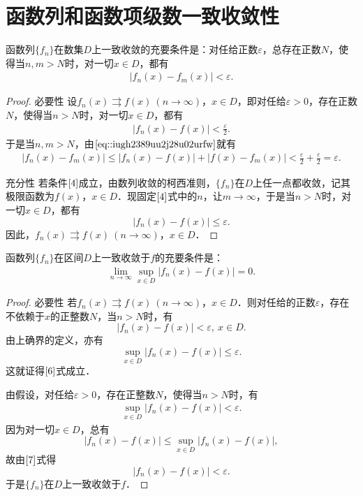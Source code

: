 \documentclass[../../main.tex]{subfiles}%
\begin{document}
\section{函数列和函数项级数一致收敛性}

\begin{theorem}[函数列一致收敛的柯西准则]\label{theorem:函数列一致收敛的柯西准则}
函数列\(\{f_n\}\)在数集\(D\)上一致收敛的充要条件是：对任给正数\(\varepsilon\)，总存在正数\(N\)，使得当\(n, m > N\)时，对一切\(x \in D\)，都有
\begin{align}
|f_n(x) - f_m(x)| < \varepsilon.\label{4}
\end{align}
\end{theorem}
\begin{proof}

{\heiti 必要性} 设\(f_n(x) \rightrightarrows f(x) \ (n \to \infty)\)，\(x \in D\)，即对任给\(\varepsilon > 0\)，存在正数\(N\)，使得当\(n > N\)时，对一切\(x \in D\)，都有
\begin{align}
|f_n(x) - f(x)| < \frac{\varepsilon}{2}. \label{eq::iugh2389uu2j28u02urfw}
\end{align}
于是当\(n, m > N\)，由\(\eqref{eq::iugh2389uu2j28u02urfw}\)就有
\begin{align*}
|f_n(x) - f_m(x)| \leqslant |f_n(x) - f(x)| + |f(x) - f_m(x)| < \frac{\varepsilon}{2} + \frac{\varepsilon}{2} = \varepsilon.
\end{align*}

{\heiti 充分性} 若条件\(\eqref{4}\)成立，由数列收敛的柯西准则，\(\{f_n\}\)在\(D\)上任一点都收敛，记其极限函数为\(f(x)\)，\(x \in D\)．现固定\(\eqref{4}\)式中的\(n\)，让\(m \to \infty\)，于是当\(n > N\)时，对一切\(x \in D\)，都有
\[
|f_n(x) - f(x)| \leqslant \varepsilon.
\]
因此，\(f_n(x) \rightrightarrows f(x) \ (n \to \infty)\)，\(x \in D\)．
\end{proof} 

\begin{theorem}
函数列\(\{f_n\}\)在区间\(D\)上一致收敛于\(f\)的充要条件是：
\begin{align}
\lim_{n \to \infty} \sup_{x \in D} |f_n(x) - f(x)| = 0. \label{6}
\end{align}
\end{theorem} 
\begin{proof}

{\heiti 必要性} 若\(f_n(x) \rightrightarrows f(x) \ (n \to \infty)\)，\(x \in D\)．则对任给的正数\(\varepsilon\)，存在不依赖于\(x\)的正整数\(N\)，当\(n > N\)时，有
\[
|f_n(x) - f(x)| < \varepsilon, \ x \in D.
\]
由上确界的定义，亦有
\[
\sup_{x \in D} |f_n(x) - f(x)| \leqslant \varepsilon.
\]
这就证得\(\eqref{6}\)式成立．

 由假设，对任给\(\varepsilon > 0\)，存在正整数\(N\)，使得当\(n > N\)时，有
\begin{align}
\sup_{x \in D} |f_n(x) - f(x)| < \varepsilon. \label{7}
\end{align}
因为对一切\(x \in D\)，总有
\[
|f_n(x) - f(x)| \leqslant \sup_{x \in D} |f_n(x) - f(x)|,
\]
故由\(\eqref{7}\)式得
\[
|f_n(x) - f(x)| < \varepsilon.
\]
于是\(\{f_n\}\)在\(D\)上一致收敛于\(f\)．
\end{proof}
\end{document}

